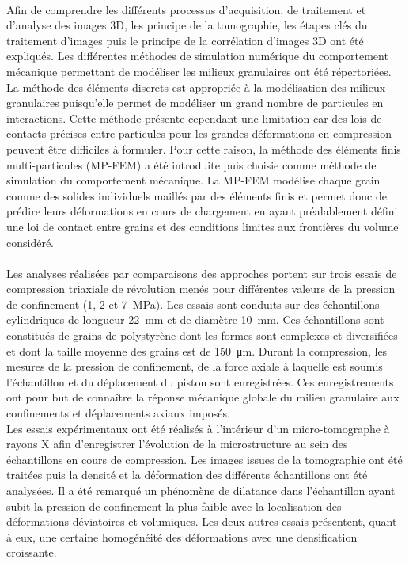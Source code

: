 \paragraph{}
Afin de comprendre les différents processus d’acquisition, de traitement et d’analyse des images 3D, les principe de la tomographie, les étapes clés du traitement d’images puis le principe de la corrélation d’images 3D ont été expliqués. Les différentes méthodes de simulation numérique du comportement mécanique permettant de modéliser les milieux granulaires ont été répertoriées. La méthode des éléments discrets est appropriée à la modélisation des milieux granulaires puisqu'elle permet de modéliser un grand nombre de particules en interactions. Cette méthode présente cependant une limitation car des  lois de contacts précises entre particules pour les grandes déformations en compression peuvent être difficiles à formuler. Pour cette raison, la méthode des éléments finis multi-particules (MP-FEM) a été introduite puis choisie comme méthode de simulation du comportement mécanique. La MP-FEM modélise chaque grain comme des solides individuels maillés par des éléments finis et permet donc de prédire leurs déformations en cours de chargement en ayant préalablement défini une loi de contact entre grains et des conditions limites aux frontières du volume considéré.

\paragraph{}
Les analyses réalisées par comparaisons des approches portent sur trois essais de compression triaxiale de révolution menés pour différentes valeurs de la pression de confinement (\num{1}, \num{2} et \SI{7}{\mega\pascal}). Les essais sont conduits sur des échantillons cylindriques de longueur \SI{22}{\milli\meter} et de diamètre \SI{10}{\milli\meter}. Ces échantillons sont constitués de grains de polystyrène dont les formes sont complexes et diversifiées et dont la taille moyenne des grains est de \SI{150}{\micro\meter}. Durant la compression, les mesures de la pression de confinement, de la force axiale à laquelle est soumis l'échantillon et du déplacement du piston sont enregistrées. Ces enregistrements ont pour but de connaître la réponse mécanique globale du milieu granulaire aux confinements et déplacements axiaux imposés.
\\Les essais expérimentaux ont été réalisés à l'intérieur d'un micro-tomographe à rayons X afin d'enregistrer l'évolution de la microstructure au sein des échantillons en cours de compression. Les images issues de la tomographie ont été traitées puis la densité et la déformation des différents échantillons ont été analysées. Il a été remarqué un phénomène de dilatance dans l'échantillon ayant subit la pression de confinement la plus faible avec la localisation des déformations déviatoires et volumiques. Les deux autres essais présentent, quant à eux, une certaine homogénéité des déformations avec une densification croissante.

